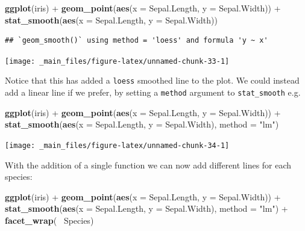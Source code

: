 \documentclass[]{book}
\newenvironment{Shaded}{\begin{snugshade}}{\end{snugshade}}
\newcommand{\KeywordTok}[1]{\textcolor[rgb]{0.13,0.29,0.53}{\textbf{{#1}}}}
\newcommand{\DataTypeTok}[1]{\textcolor[rgb]{0.13,0.29,0.53}{{#1}}}
\newcommand{\StringTok}[1]{\textcolor[rgb]{0.31,0.60,0.02}{{#1}}}
\newcommand{\NormalTok}[1]{{#1}}
\theoremstyle{definition}
\theoremstyle{definition}
\theoremstyle{definition}
\theoremstyle{remark}
\begin{document}
\begin{Shaded}
\begin{Highlighting}[]
\KeywordTok{ggplot}\NormalTok{(iris) +}
\StringTok{    }\KeywordTok{geom_point}\NormalTok{(}\KeywordTok{aes}\NormalTok{(}\DataTypeTok{x =} \NormalTok{Sepal.Length, }\DataTypeTok{y =} \NormalTok{Sepal.Width)) +}
\StringTok{    }\KeywordTok{stat_smooth}\NormalTok{(}\KeywordTok{aes}\NormalTok{(}\DataTypeTok{x =} \NormalTok{Sepal.Length, }\DataTypeTok{y =} \NormalTok{Sepal.Width))}
\end{Highlighting}
\end{Shaded}

\begin{verbatim}
## `geom_smooth()` using method = 'loess' and formula 'y ~ x'
\end{verbatim}

\begin{center}\texttt{[image: \_main\_files/figure-latex/unnamed-chunk-33-1]} \end{center}

Notice that this has added a \texttt{loess} smoothed line to the plot.
We could instead add a linear line if we prefer, by setting a
\texttt{method} argument to \texttt{stat\_smooth} e.g.

\begin{Shaded}
\begin{Highlighting}[]
\KeywordTok{ggplot}\NormalTok{(iris) +}
\StringTok{    }\KeywordTok{geom_point}\NormalTok{(}\KeywordTok{aes}\NormalTok{(}\DataTypeTok{x =} \NormalTok{Sepal.Length, }\DataTypeTok{y =} \NormalTok{Sepal.Width)) +}
\StringTok{    }\KeywordTok{stat_smooth}\NormalTok{(}\KeywordTok{aes}\NormalTok{(}\DataTypeTok{x =} \NormalTok{Sepal.Length, }\DataTypeTok{y =} \NormalTok{Sepal.Width), }\DataTypeTok{method =} \StringTok{"lm"}\NormalTok{)}
\end{Highlighting}
\end{Shaded}

\begin{center}\texttt{[image: \_main\_files/figure-latex/unnamed-chunk-34-1]} \end{center}

With the addition of a single function we can now add different lines
for each species:

\begin{Shaded}
\begin{Highlighting}[]
\KeywordTok{ggplot}\NormalTok{(iris) +}
\StringTok{    }\KeywordTok{geom_point}\NormalTok{(}\KeywordTok{aes}\NormalTok{(}\DataTypeTok{x =} \NormalTok{Sepal.Length, }\DataTypeTok{y =} \NormalTok{Sepal.Width)) +}
\StringTok{    }\KeywordTok{stat_smooth}\NormalTok{(}\KeywordTok{aes}\NormalTok{(}\DataTypeTok{x =} \NormalTok{Sepal.Length, }\DataTypeTok{y =} \NormalTok{Sepal.Width), }\DataTypeTok{method =} \StringTok{"lm"}\NormalTok{) +}
\StringTok{    }\KeywordTok{facet_wrap}\NormalTok{(~}\StringTok{ }\NormalTok{Species)}
\end{Highlighting}
\end{Shaded}
\end{document}
